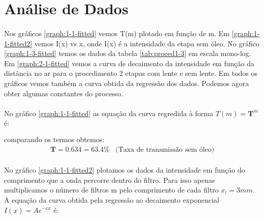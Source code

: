 \documentclass[a4paper,11pt]{article}
\begin{document}
\newpage
\section{Análise de Dados}
\paragraph{}Nos gráficos \ref{graph:1-1-fitted} vemos T(m) plotado em função de m. Em \ref{graph:1-1-fitted2} vemos I(x) vs x, onde I(x) é a intensidade da etapa sem óleo. No gráfico \ref{graph:1-3-fitted} temos os dados da tabela \ref{tab:proced1-3} em escala mono-log. Em \ref{graph:2-1-fitted} vemos a curva de decaimento da intensidade em função da distância no ar para o procedimento 2 etapas com lente e sem lente. Em todos os gráficos vemos também a curva obtida da regressão dos dados. Podemos agora obter algumas constantes do processo.

\paragraph{} No gráfico \ref{graph:1-1-fitted} as equação da curva regredida à forma $T(m) = \textbf{T}^m$ é:
\begin{equation}
	\begin{array}{cl}
		   &\\	
	\end{array}
	\label{eq:1-1}
\end{equation}
comparando os termos obtemos:
\begin{displaymath}
	\begin{array}{cl}
	 \textbf{T} = 0.634 = 63.4 \% & \mbox{(Taxa de transmissão sem óleo)}
	\end{array}
\end{displaymath}


\paragraph{} No gráfico \ref{graph:1-1-fitted2} plotamos os dados da intensidade em função do comprimento que a onda percorre dentro do filtro. Para isso apenas multiplicamos o número de filtros m pelo comprimento de cada filtro $x_l = 3 mm$. A equação da curva obtida pela regressão ao decaimento exponencial $I(x) = Ae^{-cx}$ é:
\begin{displaymath}
	\begin{array}{c}
		  \\			
	\end{array}
	\label{eq:1-2}
\end{displaymath}
\end{document}
